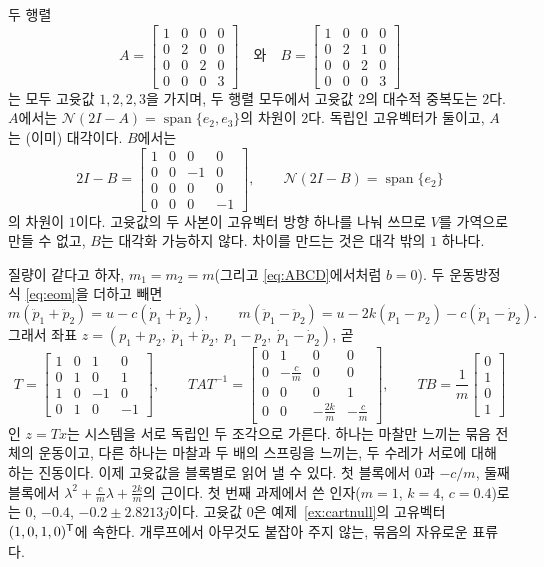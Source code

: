 \documentclass[11pt]{article}
\begin{document}
\begin{example}[중복도가 같을 때와 다를 때]
두 행렬
\[
   A=\begin{bmatrix}1&0&0&0\\0&2&0&0\\0&0&2&0\\0&0&0&3\end{bmatrix}
   \quad\text{와}\quad
   B=\begin{bmatrix}1&0&0&0\\0&2&1&0\\0&0&2&0\\0&0&0&3\end{bmatrix}
\]
는 모두 고윳값 $1,2,2,3$을 가지며, 두 행렬 모두에서 고윳값 $2$의 대수적 중복도는
$2$다. $A$에서는 $\mathcal N(2I-A)=\operatorname{span}\{e_2,e_3\}$의 차원이 $2$다.
독립인 고유벡터가 둘이고, $A$는 (이미) 대각이다. $B$에서는
\[
   2I-B=\begin{bmatrix}1&0&0&0\\0&0&-1&0\\0&0&0&0\\0&0&0&-1\end{bmatrix},
   \qquad \mathcal N(2I-B)=\operatorname{span}\{e_2\}
\]
의 차원이 $1$이다. 고윳값의 두 사본이 고유벡터 방향 하나를 나눠 쓰므로 $V$를
가역으로 만들 수 없고, $B$는 대각화 가능하지 않다. 차이를 만드는 것은 대각 밖의
$1$ 하나다.
\end{example}

\begin{example}[두 수레, 분리하기]\label{ex:cartdecouple}
질량이 같다고 하자, $m_1=m_2=m$(그리고 \eqref{eq:ABCD}에서처럼 $b=0$). 두 운동방정식
\eqref{eq:eom}을 더하고 빼면
\[
   m(\ddot p_1+\ddot p_2) = u - c(\dot p_1+\dot p_2),\qquad
   m(\ddot p_1-\ddot p_2) = u - 2k(p_1-p_2) - c(\dot p_1-\dot p_2).
\]
그래서 좌표 $z=(p_1+p_2,\;\dot p_1+\dot p_2,\;p_1-p_2,\;\dot p_1-\dot p_2)$, 곧
\[
   T=\begin{bmatrix}1&0&1&0\\0&1&0&1\\1&0&-1&0\\0&1&0&-1\end{bmatrix},
   \qquad
   TAT^{-1}=\begin{bmatrix}0&1&0&0\\0&-\frac cm&0&0\\0&0&0&1\\0&0&-\frac{2k}m&-\frac cm\end{bmatrix},
   \qquad TB=\frac1m\begin{bmatrix}0\\1\\0\\1\end{bmatrix}
\]
인 $z=Tx$는 시스템을 서로 독립인 두 조각으로 가른다. 하나는 마찰만 느끼는 묶음
전체의 운동이고, 다른 하나는 마찰과 두 배의 스프링을 느끼는, 두 수레가 서로에 대해
하는 진동이다. 이제 고윳값을 블록별로 읽어 낼 수 있다. 첫 블록에서 $0$과 $-c/m$,
둘째 블록에서 $\lambda^{2}+\frac cm\lambda+\frac{2k}{m}$의 근이다. 첫 번째 과제에서
쓴 인자($m=1$, $k=4$, $c=0.4$)로는 $0$, $-0.4$, $-0.2\pm2.8213j$이다. 고윳값
$0$은 예제~\ref{ex:cartnull}의 고유벡터 $(1,0,1,0)^{\mathsf{T}}$에 속한다. 개루프에서 아무것도
붙잡아 주지 않는, 묶음의 자유로운 표류다.
\end{example}
\end{document}
